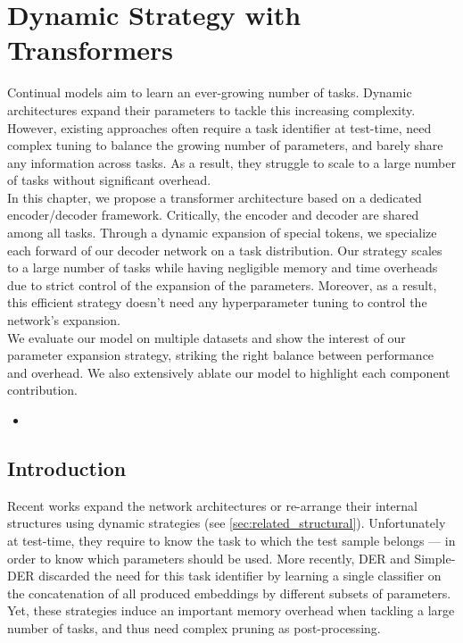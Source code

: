 \chapter{Dynamic Strategy with Transformers}
\label{chapter:dynamic}

\begin{chapabstract}
    Continual models aim to learn an ever-growing number of tasks. Dynamic architectures expand
    their parameters to tackle this increasing complexity. However,
    existing approaches often require a task identifier at test-time, need complex tuning to balance
    the growing number of parameters, and barely share any information across tasks. As a result,
    they struggle to scale to a large number of tasks without significant overhead.\\
    In this chapter, we propose a transformer architecture based on a dedicated encoder/decoder
    framework. Critically, the encoder and decoder are shared among all tasks. Through a dynamic
    expansion of special tokens, we specialize each forward of our decoder network on a task
    distribution. Our strategy scales to a large number of tasks while having negligible memory and
    time overheads due to strict control of the expansion of the parameters. Moreover, as a result,
    this efficient strategy doesn't need any hyperparameter tuning to control the network's
    expansion.\\
    We evaluate our model on multiple datasets and show the interest of our parameter expansion strategy,
    striking the right balance between performance and overhead. We also extensively ablate our
    model to highlight each component contribution.

    \begin{itemize}
        \item {}
    \end{itemize}

\end{chapabstract}
\newpage

\minitoc
{} 



\section{Introduction}
\label{sec:dytox_intro}


Recent works expand the network architectures or re-arrange their internal structures using dynamic
strategies (see \autoref{sec:related_structural}). Unfortunately at test-time, they require to know
the task to which the test sample belongs --- in order to know which parameters should be used. More
recently, DER \citep{yan2021der} and Simple-DER \citep{li2021preserve} discarded the need for this
task identifier by learning a single classifier on the concatenation of all produced embeddings by
different subsets of parameters. Yet, these strategies induce an important memory overhead when
tackling a large number of tasks, and thus need complex pruning as post-processing.

